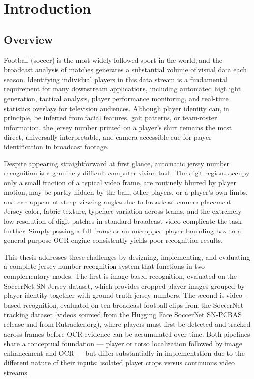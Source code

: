 \chapter{Introduction}
\label{ch:introduction}

\section{Overview}
\label{sec:overview}

Football (soccer) is the most widely followed sport in the world, and
the broadcast analysis of matches generates a substantial volume of
visual data each season. Identifying individual players in this data
stream is a fundamental requirement for many downstream applications,
including automated highlight generation, tactical analysis, player
performance monitoring, and real-time statistics overlays for
television audiences. Although player identity can, in principle, be
inferred from facial features, gait patterns, or team-roster information,
the jersey number printed on a player's shirt remains the most
direct, universally interpretable, and camera-accessible cue for
player identification in broadcast footage.

Despite appearing straightforward at first glance, automatic jersey
number recognition is a genuinely difficult computer vision task. The
digit regions occupy only a small fraction of a typical video frame,
are routinely blurred by player motion, may be partly hidden by the
ball, other players, or a player's own limbs, and can appear at
steep viewing angles due to broadcast camera placement. Jersey color,
fabric texture, typeface variation across teams, and the extremely low
resolution of digit patches in standard broadcast video complicate the
task further. Simply passing a full frame or an uncropped player
bounding box to a general-purpose OCR engine consistently yields poor
recognition results.

This thesis addresses these challenges by designing, implementing, and
evaluating a complete jersey number recognition system that functions in
two complementary modes. The first is image-based recognition,
evaluated on the SoccerNet SN-Jersey dataset, which provides cropped
player images grouped by player identity together with ground-truth
jersey numbers. The second is video-based recognition, evaluated on ten
broadcast football clips from the SoccerNet tracking dataset (videos
sourced from the Hugging Face SoccerNet SN-PCBAS release and from
Rutracker.org), where players must first be detected and tracked across
frames before OCR evidence can be accumulated over time. Both pipelines
share a conceptual foundation --- player or torso localization followed
by image enhancement and OCR --- but differ substantially in
implementation due to the different nature of their inputs: isolated
player crops versus continuous video streams.

